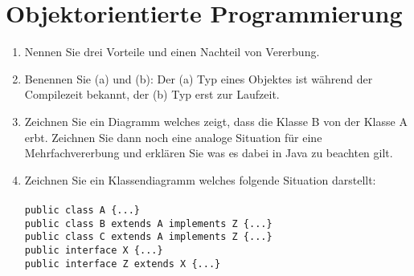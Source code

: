 \newpage
\section{Objektorientierte Programmierung}

\begin{enumerate}
	\item Nennen Sie drei Vorteile und einen Nachteil von Vererbung.
	\item Benennen Sie (a) und (b): Der (a) Typ eines Objektes ist 
	    während der Compilezeit bekannt, der (b) Typ erst zur Laufzeit.
	\item Zeichnen Sie ein Diagramm welches zeigt, dass die Klasse 
	    B von der Klasse A erbt. Zeichnen Sie dann noch eine analoge
        Situation für eine Mehrfachvererbung und erklären Sie was
        es dabei in Java zu beachten gilt.
    \item Zeichnen Sie ein Klassendiagramm welches folgende 
        Situation darstellt:\\\\
        \verb?public class A {...}?\\
        \verb?public class B extends A implements Z {...}?\\
        \verb?public class C extends A implements Z {...}?\\
        \verb?public interface X {...}?\\
        \verb?public interface Z extends X {...}?
\end{enumerate}
